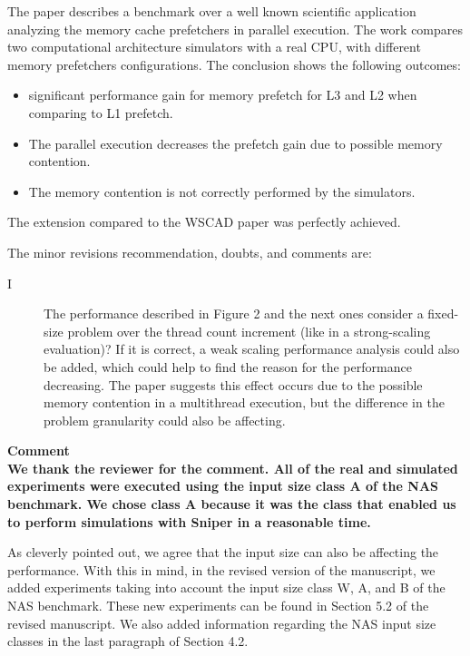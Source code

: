\documentclass{article}
\newcounter{answer}
\newenvironment{answer}
{ \refstepcounter{answer}\vspace{0.5cm}\bfseries\noindent Comment~\theanswer\\ }
{ \vspace{0.5cm} }
\begin{document}
The paper describes a benchmark over a well known scientific application analyzing the memory cache prefetchers in parallel execution.
The work compares two computational architecture simulators with a real CPU, with different memory prefetchers configurations.
The conclusion shows the following outcomes:

\begin{itemize}
    \item significant performance gain for memory prefetch for L3 and L2 when comparing to L1 prefetch.
    \item The parallel execution decreases the prefetch gain due to possible memory contention.
    \item The memory contention is not correctly performed by the simulators.
\end{itemize}

The extension compared to the WSCAD paper was perfectly achieved.\vspace{.5cm}

The minor revisions recommendation, doubts, and comments are:

\begin{description}
    \item[I] The performance described in Figure 2 and the next ones consider a fixed-size problem over the thread count increment (like in a strong-scaling evaluation)? If it is correct, a weak scaling performance analysis could also be added, which could help to find the reason for the performance decreasing. The paper suggests this effect occurs due to the possible memory contention in a multithread execution, but the difference in the problem granularity could also be affecting.
\end{description}

\begin{answer}

We thank the reviewer for the comment. All of the real and simulated experiments were executed using the input size class A of the NAS benchmark. We chose class A because it was the class that enabled us to perform simulations with Sniper in a reasonable time.

As cleverly pointed out, we agree that the input size can also be affecting the performance. With this in mind, in the revised version of the manuscript, we added experiments taking into account the input size class W, A, and B of the NAS benchmark. These new experiments can be found in Section 5.2 of the revised manuscript. We also added information regarding the NAS input size classes in the last paragraph of Section 4.2.
\end{answer}
\end{document}
